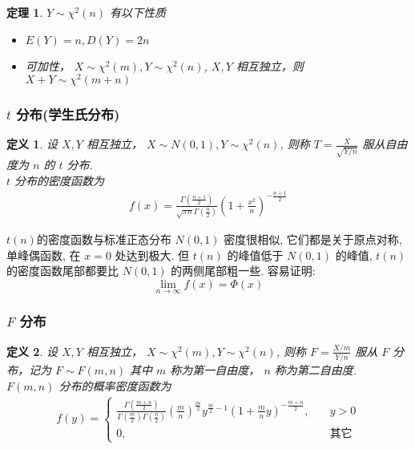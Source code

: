 \documentclass{ctexart}
\newcommand{\。}{．} %
\newenvironment{lvse}{
    \begin{tcolorbox}[enhanced, breakable, colback=qlv, boxrule=0pt, frame hidden,
        borderline west={0.7mm}{0.1mm}{slv}]
    }
    {\end{tcolorbox}}
\newenvironment{huangse}{
    \begin{tcolorbox}[enhanced, breakable, colback=qhuang, boxrule=0pt, frame hidden,
        borderline west={0.7mm}{0.1mm}{shuang}]
    }
    {\end{tcolorbox}}
\theoremstyle{t} %
\newtheorem{dyhj}{\color{slv} 定义}[subsection] %
\newtheorem{dlhj}{\color{shuang} 定理}[subsection]
\newenvironment{dy}{\begin{lvse}\begin{dyhj}}{\end{dyhj}\end{lvse}}
\newenvironment{dl}{\begin{huangse}\begin{dlhj}}{\end{dlhj}\end{huangse}}
\begin{document}
\begin{dl}
    $Y \sim \chi^2(n)$ 有以下性质
    \begin{itemize}
        \item $E(Y) = n, D(Y) = 2n$
        \item 可加性， $X \sim \chi^2(m), Y \sim \chi^2(n)$, $X, Y$ 相互独立，则 $X + Y \sim \chi^2(m + n)$
    \end{itemize}
\end{dl}

\subsubsection{$t$ 分布(学生氏分布)}

\begin{dy}
    设 $X, Y$ 相互独立， $X \sim N(0, 1), Y \sim \chi^2(n)$, 则称 $T = \frac{X}{\sqrt{Y/n}}$ 服从自由度为 $n$ 的 $t$ 分布. \\
    $t$ 分布的密度函数为
    \begin{align*}
        f(x) = \frac{\Gamma\left(\frac{n + 1}{2}\right)}{\sqrt{\pi n }\Gamma\left(\frac{n}{2}\right)}\left(1 + \frac{x^2}{n}\right)^{-\frac{n + 1}{2}}
    \end{align*}
\end{dy}

$t(n)$的密度函数与标准正态分布 $N(0, 1)$ 密度很相似, 它们都是关于原点对称, 单峰偶函数, 在 $x = 0$ 处达到极大. 但 $t(n)$ 的峰值低于
$N(0, 1)$ 的峰值, $t(n)$ 的密度函数尾部都要比 $N(0, 1)$ 的两侧尾部粗一些. 容易证明:
\[
    \lim_{n \to \infty} f(x) = \Phi(x)
\]

\subsubsection{$F$ 分布}

\begin{dy}
    设 $X, Y$ 相互独立， $X \sim \chi^2(m), Y \sim \chi^2(n)$, 则称 $F = \frac{X / m}{Y / n}$ 服从 $F$ 分布，记为 $F \sim F(m, n)$ 其中 $m$ 称为第一自由度， $n$ 称为第二自由度. \\
    $F(m, n)$ 分布的概率密度函数为
    \begin{align*}
        f(y) = \begin{cases}
            \frac{\Gamma\left(\frac{m + n}{2}\right)}{\Gamma\left(\frac{m}{2}\right)\Gamma\left(\frac{n}{2}\right)}\left(\frac{m}{n}\right)^{\frac{m}{2}}y^{\frac{m}{2} - 1}\left(1 + \frac{m}{n}y\right)^{-\frac{m + n}{2}},& \quad y > 0 \\
            0,& \quad \text{其它} 
        \end{cases}
    \end{align*}
\end{dy}
\end{document}
